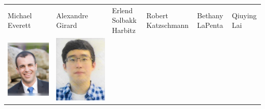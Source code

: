 \documentclass[landscape,a0paper,fontscale=0.292]{baposter}
\begin{document}
\begin{poster}
{\begin{center}
\begin{tabularx}{\linewidth}{X X X X X X}
{\tiny \centering Michael Everett }& {\tiny \centering Alexandre Girard }& {\tiny \centering Erlend Solbakk Harbitz }& {\tiny \centering Robert Katzschmann }& {\tiny \centering Bethany LaPenta }& {\tiny \centering Qiuying Lai }\\ 
 {\centering \includegraphics[width=0.6\linewidth]{joe-wl.jpg}}&
{\centering \includegraphics[width=0.6\linewidth]{sang.jpg}}&

\end{tabularx}
\end{center}}
\end{poster}
\end{document}
